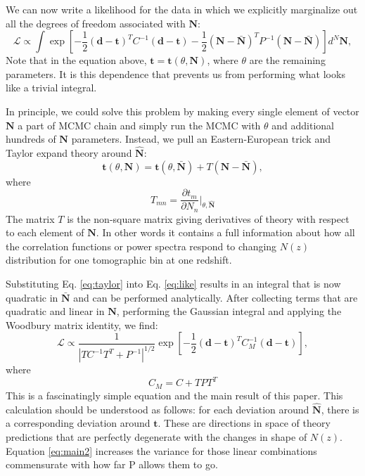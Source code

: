 \documentclass[a4paper,11pt]{article}
\newcommand{\vd}{\mathbf{d}}
\newcommand{\vt}{\mathbf{t}}
\newcommand{\vN}{\mathbf{N}}
\begin{document}
We can now write a likelihood for the data in which we explicitly marginalize out all the degrees of freedom associated with $\vN$:
\begin{equation}
\mathcal{L} \propto  \int \exp\left [-\frac{1}{2} (\vd-\vt)^T C^{-1} (\vd-\vt) -\frac{1}{2} (\vN - \bar{\vN})^T P^{-1} (\vN -\bar{\vN}) \right]  d^N\vN, \label{eq:like2}
  \end{equation}
  Note that in the equation above, $\vt=\vt(\theta,\vN)$, where $\theta$ are the remaining parameters. It is this dependence that prevents us from performing what looks like a trivial integral.

  In principle, we could solve this problem by making every single element of vector $\vN$ a part of MCMC chain and simply run the MCMC with $\theta$ and additional hundreds of $\vN$ parameters. Instead, we pull an Eastern-European trick and Taylor expand theory around $\hat{\vN}$:
  \begin{equation}
    \vt(\theta,\vN) = \vt(\theta,\bar{\vN}) + T \left(\vN - \bar{\vN} \right), \label{eq:taylor}
  \end{equation}
  where
  \begin{equation}
    T_{mn} = \frac{\partial t_m}{\partial N_n} \bigg|_{\theta,\hat{\vN}}
  \end{equation}
  The matrix $T$ is the non-square matrix giving derivatives of theory with respect to each element of $\vN$. In other words it contains a full information about how all the correlation functions or power spectra respond to changing $N(z)$ distribution for one tomographic bin at one redshift.

  Substituting Eq. \ref{eq:taylor} into Eq. \ref{eq:like} results in an integral that is now quadratic in $\bar{\vN}$ and can be performed analytically. After collecting terms that are quadratic and linear in $\vN$, performing the Gaussian integral and applying the Woodbury matrix identity, we find:
  \begin{equation}
    \mathcal{L} \propto \frac{1}{|T C^{-1} T^T +P^{-1} |^{1/2}} \exp\left [-\frac{1}{2} (\vd-\vt)^T C_M^{-1} (\vd-\vt) \right], \label{eq:main1}
  \end{equation}
  where
  \begin{equation}
    C_M = C + T PT^T \label{eq:main2}
  \end{equation}
  This is a fascinatingly simple equation and the main result of this paper. This calculation should be understood as follows: for each deviation around $\hat{\vN}$, there is a corresponding deviation around $\vt$. These are directions in space of theory predictions that are perfectly degenerate with the changes in shape of $N(z)$.  Equation \ref{eq:main2}  increases the variance for those linear combinations commensurate with how far P allows them to go.
\end{document}
